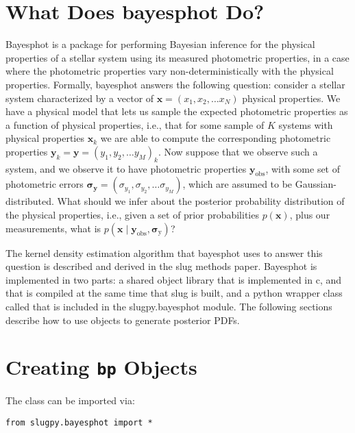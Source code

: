 \documentclass[letterpaper,10pt,english]{sphinxmanual}
\begin{document}
\section{What Does bayesphot Do?}
\label{bayesphot:what-does-bayesphot-do}
Bayesphot is a package for performing Bayesian inference for the physical properties of a stellar system using its measured photometric properties, in a case where the photometric properties vary non-deterministically with the physical properties. Formally, bayesphot answers the following question: consider a stellar system characterized by a vector of \(\mathbf{x} = (x_1, x_2, \ldots x_N)\) physical properties. We have a physical model that lets us sample the expected photometric properties as a function of physical properties, i.e., that for some sample of \(K\) systems with physical properties \(\mathbf{x}_k\) we are able to compute the corresponding photometric properties \(\mathbf{y}_k = \mathbf{y} = (y_1, y_2, \ldots y_M)_k\). Now suppose that we observe such a system, and we observe it to have photometric properties \(\mathbf{y}_{\mathrm{obs}}\), with some set of photometric errors \(\mathbf{\sigma}_{\mathbf{y}} = (\sigma_{y_1}, \sigma_{y_2}, \ldots \sigma_{y_M})\), which are assumed to be Gaussian-distributed. What should we infer about the posterior probability distribution of the physical properties, i.e., given a set of prior probabilities \(p(\mathbf{x})\), plus our measurements, what is \(p(\mathbf{x} \mid \mathbf{y}_{\mathrm{obs}}, \mathbf{\sigma}_{\mathrm{y}})\)?

The kernel density estimation algorithm that bayesphot uses to answer this question is described and derived in the slug methods paper. Bayesphot is implemented in two parts: a shared object library that is implemented in c, and that is compiled at the same time that slug is built, and a python wrapper class called  that is included in the slugpy.bayesphot module. The following sections describe how to use  objects to generate posterior PDFs.


\section{Creating \texttt{bp} Objects}
\label{bayesphot:creating-bp-objects}
The  class can be imported via:

\begin{Verbatim}[commandchars=\\\{\}]
from slugpy.bayesphot import *
\end{Verbatim}
\end{document}
